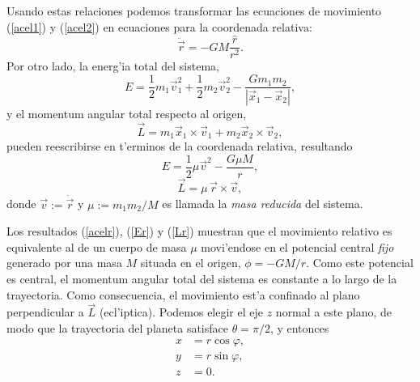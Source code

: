 Usando estas relaciones podemos transformar las ecuaciones de movimiento (\ref{acel1}) y (\ref{acel2}) en ecuaciones para la coordenada relativa:
\begin{equation}
\ddot{\vec{r}}=-GM\frac{\hat{r}}{r^2} .\label{acelr}
\end{equation}
Por otro lado, la energ'ia total del sistema,
\begin{equation}
E=\frac{1}{2}m_1\vec{v}_1^2+\frac{1}{2}m_2\vec{v}_2^2-\frac{Gm_1m_2}{|\vec{x}_1-\vec{x}_2|},
\end{equation}
y el momentum angular total respecto al origen,
\begin{equation}
\vec{L}=m_1\vec{x}_1\times\vec{v}_1+m_2\vec{x}_2\times\vec{v}_2,
\end{equation}
pueden reescribirse en t'erminos de la coordenada relativa, resultando
\begin{equation}\label{Er}
E=\frac{1}{2}\mu \vec{v}^2-\frac{G\mu M}{r},
\end{equation}
\begin{equation}\label{Lr}
\vec{L}=\mu\,\vec{r}\times\vec{v},
\end{equation}
donde $\vec{v}:=\dot{\vec{r}}$ y $\mu:=m_1m_2/M$ es llamada la \textit{masa reducida} del sistema.

Los resultados (\ref{acelr}), (\ref{Er}) y (\ref{Lr}) muestran que el movimiento relativo es equivalente al de un cuerpo de masa $\mu$ movi'endose en el potencial central \textit{fijo} generado por una masa $M$ situada en el origen, $\phi=-GM/r$. Como este potencial es central, el momentum angular total del sistema es constante a lo largo de la trayectoria. Como consecuencia, el movimiento est'a confinado al plano perpendicular a $\vec{L}$ (ecl'iptica). Podemos elegir el eje $z$ normal a este plano, de modo que la trayectoria del planeta satisface $\theta=\pi/2$, y entonces
\begin{align}
x & = r\cos\varphi ,\\
y & = r\sin\varphi ,\\
z & = 0.
\end{align}

